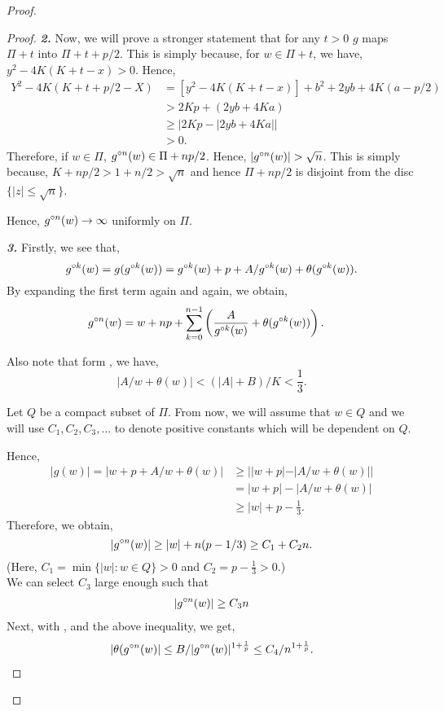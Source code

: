 \begin{proof}
\begin{proof}
	\noindent \textbf{\emph{2.}} Now, we will prove a stronger statement that for any \( t>0 \)
	\( g \) maps \( \Pi+t \) into \( \Pi+t+p /2 \). This is simply because, for \( w\in\Pi+t \),
	we have, \( y^2-4K(K+t-x)>0 \). Hence,
	\begin{align*}
		Y^2-4K(K+t+p /2-X)&=[y^2-4K(K+t-x)]+b^2+2yb+4K(a-p /2)\\
		&> 2Kp+(2yb+4Ka)\\
		&\ge |2Kp - |2yb+4Ka| |\\
		&>0
	.\end{align*}
	Therefore, if \( w\in\Pi \), \( \gog[n](w)\in \Pi+np /2 \). Hence, \( |\gog[n](w)|>\sqrt{n}  \).
	This is simply because, \( K+np /2>1+n /2>\sqrt{n}  \) and hence \( \Pi+np /2 \) is disjoint from the
disc \( \{|z|\le \sqrt{n} \} \).

Hence, \( \gog[n](w)\to \infty \) uniformly on \( \Pi \).\\
\vspace{1pt}

\noindent \textbf{\emph{3.}} Firstly, we see that, \[
	\gog[k](w)=g(\gog[k](w))=\gog[k](w)+p+A /\gog[k](w)+\theta (\gog[k](w))
.\] 
By expanding the first term again and again, we obtain,
\begin{align}
	\gog[n](w)&=w+np+ \sum_{k=0}^{n-1} \left(\frac{A}{\gog[k](w)}  +\theta(\gog[k](w))\right) \label{eqn3.4}
.\end{align}

Also note that form , we have, \[
	|A /w+\theta (w)|<(|A|+B) /K <\frac{1}{3}
.\] 

Let \( Q \) be a compact subset of \( \Pi \). From now, we will assume that \( w\in Q \) and we will use
\( C_1,C_2,C_3,\ldots  \) to denote positive constants which will be dependent on \( Q \).

Hence,
\begin{align*}
|g(w)|=|w+p+A /w+\theta (w)|&\ge ||w+p|-|A /w+\theta (w)| |\\
								&= |w+p|-|A /w+\theta (w)|\\
								&\ge |w|+p-\frac{1}{3}
.\end{align*}
Therefore, we obtain, \[
	|\gog[n](w)|\ge |w|+n(p-1 /3)\ge C_1+C_2n
.\] 
(Here, \( C_1=\min\{|w|:w\in Q\}>0 \) and \( C_2=p-\frac{1}{3}>0 \).)\\
We can select \( C_3 \) large enough such that
\begin{align}
	|\gog[n](w)|\ge C_3 n\label{eqn3.5}
\end{align}
Next, with , and the above inequality, we get,
\begin{align}
	|\theta (\gog[n](w)|\le B /|\gog[n](w)|^{1+\frac{1}{p}}\le C_4 /n^{1+\frac{1}{p}}\label{eqn3.6}
.\end{align}


\end{proof}
\end{proof}
